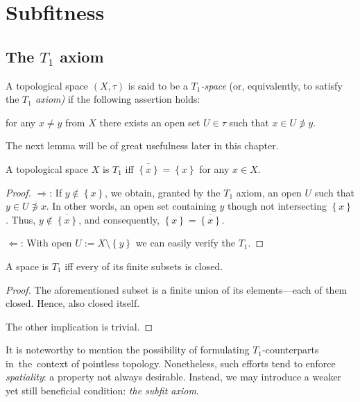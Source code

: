 \chapter{Subfitness}

\section{The $T_1$ axiom}

\begin{df}[$T_1$]
  A topological space $(X, \tau)$ is said to be a \emph{$T_1$-space\/} (or,
  equivalently, to satisfy the \emph{$T_1$ axiom)\/} if the following assertion
  holds:
  \begin{center}
    for any $x \ne y$ from $X$ there exists an open set $U\in \tau$ such that
    $x\in U \not\owns y$.
  \end{center}
\end{df}

The next lemma will be of great usefulness later in this chapter.

\begin{lem} \label{T1Char}
  A topological space $X$ is $T_1$ iff $\overline{\left\{x\right\}} =
  \left\{x\right\}$ for any $x\in X$.
\end{lem}

\begin{proof}
  $\Rightarrow$: If $y\not\in \left\{x\right\}$, we obtain, granted by the
  $T_1$ axiom, an open $U$ such that $y\in U\not\owns x$.
  In other words, an open set containing $y$ though not intersecting
  $\left\{x\right\}$.
  Thus, $y\not\in \overline{\left\{x\right\}}$, and consequently,
  $\left\{x\right\} = \overline{\left\{x\right\}}$.

  $\Leftarrow$: With open $U:= X\setminus \left\{y\right\}$ we can easily
  verify the $T_1$.
\end{proof}

\begin{cor}
  A space is $T_1$ iff every of its finite subsets is closed.
\end{cor}

\begin{proof}
  The aforementioned subset is a finite union of its elements---each of them
  closed.
  Hence, also closed itself.

  The other implication is trivial.
\end{proof}

It is noteworthy to mention the possibility of formulating $T_1$-counterparts
in~the~context of pointless topology.
Nonetheless, such efforts tend to enforce {\sl spatiality\/}: a property not
always desirable.
Instead, we may introduce a weaker yet still beneficial condition: {\sl the
subfit axiom\/}.

